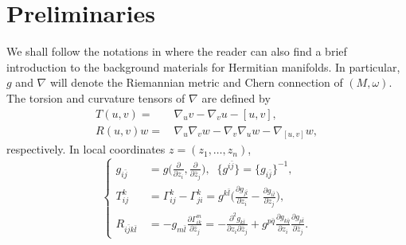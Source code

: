\documentclass[12pt]{amsart}
\theoremstyle{definition}
\numberwithin{equation}{section}
\begin{document}
\section{Preliminaries}
\label{glq-P}
\setcounter{equation}{0}
\medskip

We shall follow the notations in \cite{GL10} where the reader can also
find a brief introduction to the background materials for Hermitian
manifolds.
In particular, $g$ and $\nabla$ will denote the
Riemannian metric and Chern connection of $(M, \omega)$. The
torsion and curvature tensors of $\nabla$ are defined by
\begin{equation}
\label{cma-K95}
\begin{aligned}
   T (u, v)  = \,& \nabla_u v - \nabla_v u - [u,v], \\
 R (u, v) w  = \,& \nabla_u \nabla_v w - \nabla_v \nabla_u w - \nabla_{[u,v]} w,
\end{aligned}
\end{equation}
respectively.
In local coordinates $z = (z_1, \ldots, z_n)$, 
\begin{equation}
\label{cma-K70}
\left\{ \begin{aligned}
 g_{i {\bar{j}}} \,& = g \Big(\frac{\partial}{\partial z_i},
 \frac{\partial}{\partial {\bar{z}}_j}\Big), \;\; \{g^{i{\bar{j}}}\} = \{g_{i{\bar{j}}}\}^{-1}, \\
 
  T^k_{ij} \,& = \Gamma^k_{ij} - \Gamma^k_{ji}
   = g^{k{\bar{l}}} \Big(\frac{\partial g_{j{\bar{l}}}}{\partial z_i}
           - \frac{\partial g_{i{\bar{l}}}}{\partial z_j}\Big),  \\
 R_{i{\bar{j}} k{\bar{l}}} \,&   =  - g_{m {\bar{l}}} \frac{\partial \Gamma_{ik}^m}{\partial {\bar{z}}_j}
 = - \frac{\partial^2 g_{k{\bar{l}}}}{\partial z_i \partial {\bar{z}}_j}
       + g^{p{\bar{q}}} \frac{\partial g_{k{\bar{q}}}}{\partial z_i}
                  \frac{\partial g_{p{\bar{l}}}}{\partial {\bar{z}}_j}.
\end{aligned} \right.
\end{equation}
\end{document}
